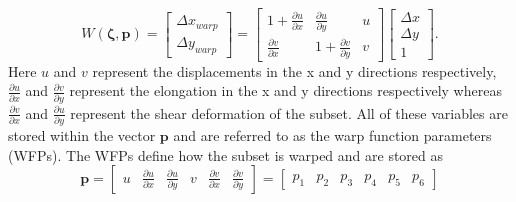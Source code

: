 \documentclass[12pt,oneside,openany,a4paper, %
english, %
masters-t, goldenblock]{usthesis}
\begin{document}

\begin{equation}
  W (\bm{\zeta},\bm{p}) = 
  \begin{bmatrix}
  \Delta x_{warp} \\
  \Delta y_{warp}
  \end{bmatrix} 
  = \begin{bmatrix}
  1+\frac{\partial u}{\partial x} & \frac{\partial u}{\partial y} & u\\
  \frac{\partial v}{\partial x} & 1+\frac{\partial v}{\partial y} & v 
  \end{bmatrix}
  \begin{bmatrix}
  \Delta x \\
  \Delta y \\
  1
  \end{bmatrix}.
  \label{eq:warp}
\end{equation}
Here $u$ and $v$ represent the displacements in the x and y directions respectively, $\frac{\partial u}{\partial x}$ and $\frac{\partial v}{\partial y}$ represent the elongation in the x and y directions respectively whereas $\frac{\partial v}{\partial x}$ and $\frac{\partial u}{\partial y}$ represent the shear deformation of the subset. All of these variables are stored within the vector $\bm{p}$ and are referred to as the warp function parameters (WFPs). The WFPs define how the subset is warped and are stored as
\begin{equation}
  \bm{p} = \begin{bmatrix} u & \frac{\partial u}{\partial x} & \frac{\partial u}{\partial y} & v & \frac{\partial v}{\partial x} & \frac{\partial v}{\partial y} \end{bmatrix} = \begin{bmatrix} p_1 & p_2 & p_3 & p_4 & p_5 & p_6 \end{bmatrix}
\end{equation}
\end{document}

